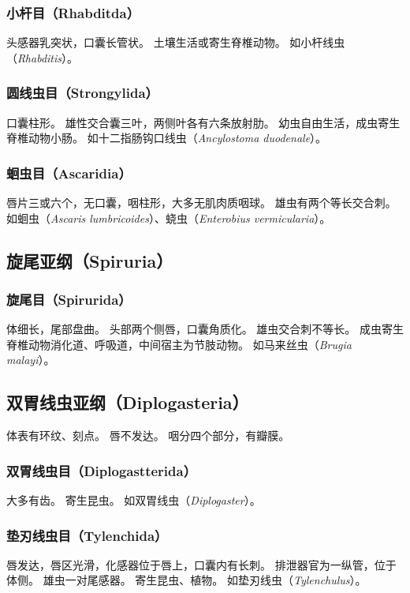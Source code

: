 \documentclass[11pt]{article}
\begin{document}
\subsubsection{小杆目（Rhabditda）}
头感器乳突状，口囊长管状。
土壤生活或寄生脊椎动物。
如小杆线虫（\textit{Rhabditis}）。

\subsubsection{圆线虫目（Strongylida）}
口囊柱形。
雄性交合囊三叶，两侧叶各有六条放射肋。
幼虫自由生活，成虫寄生脊椎动物小肠。
如十二指肠钩口线虫（\textit{Ancylostoma duodenale}）。

\subsubsection{蛔虫目（Ascaridia）}
唇片三或六个，无口囊，咽柱形，大多无肌肉质咽球。
雄虫有两个等长交合刺。
如蛔虫（\textit{Ascaris lumbricoides}）、蛲虫（\textit{Enterobius vermicularia}）。

\subsection{旋尾亚纲（Spiruria）}
\subsubsection{旋尾目（Spirurida）}
体细长，尾部盘曲。
头部两个侧唇，口囊角质化。
雄虫交合刺不等长。
成虫寄生脊椎动物消化道、呼吸道，中间宿主为节肢动物。
如马来丝虫（\textit{Brugia malayi}）。

\subsection{双胃线虫亚纲（Diplogasteria）}
体表有环纹、刻点。
唇不发达。
咽分四个部分，有瓣膜。

\subsubsection{双胃线虫目（Diplogastterida）}
大多有齿。
寄生昆虫。
如双胃线虫（\textit{Diplogaster}）。

\subsubsection{垫刃线虫目（Tylenchida）}
唇发达，唇区光滑，化感器位于唇上，口囊内有长刺。
排泄器官为一纵管，位于体侧。
雄虫一对尾感器。
寄生昆虫、植物。
如垫刃线虫（\textit{Tylenchulus}）。
\end{document}
